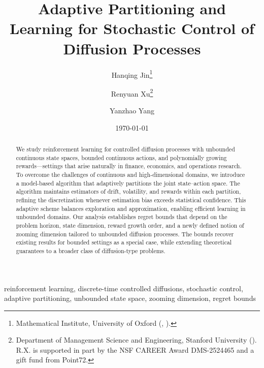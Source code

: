 \documentclass[final,supplement]{siamart251216}
\begin{document}
\title{Adaptive Partitioning and Learning for Stochastic Control of Diffusion Processes}
\author{Hanqing Jin\thanks{Mathematical Institute, University of Oxford
(, ).}
\and Renyuan Xu\thanks{Department of Management Science and Engineering,
Stanford University (). R.X. is supported in
part by the NSF CAREER Award DMS-2524465 and a gift fund from Point72.}
\and Yanzhao Yang\footnotemark[1]}



\date{\today}
\maketitle
{}

\ifnum{}\relax
\begin{abstract}
    We study reinforcement learning for controlled diffusion processes with unbounded continuous state spaces, bounded continuous actions, and polynomially growing rewards—settings that arise naturally in finance, economics, and operations research. To overcome the challenges of continuous and high-dimensional domains, we introduce a model-based algorithm that adaptively partitions the joint state–action space. The algorithm maintains estimators of drift, volatility, and rewards within each partition, refining the discretization whenever estimation bias exceeds statistical confidence. This adaptive scheme balances exploration and approximation, enabling efficient learning in unbounded domains. Our analysis establishes regret bounds that depend on the problem horizon, state dimension, reward growth order, and a newly defined notion of zooming dimension tailored to unbounded diffusion processes. The bounds recover existing results for bounded settings as a special case, while extending theoretical guarantees to a broader class of diffusion-type problems.%
\end{abstract}

\begin{keywords}
reinforcement learning, discrete-time controlled diffusions, stochastic control,
adaptive partitioning, unbounded state space, zooming dimension, regret bounds
\end{keywords}
\end{document}
